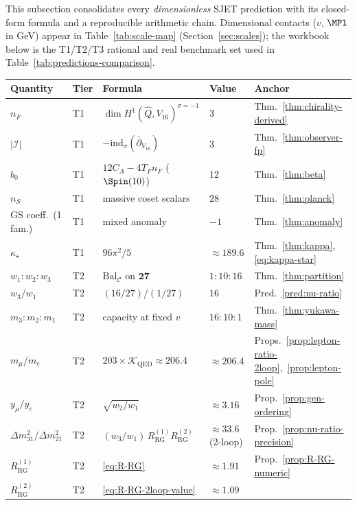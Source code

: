 This subsection consolidates every \emph{dimensionless} SJET prediction with
its closed-form formula and a reproducible arithmetic chain. Dimensional
contacts ($v$, $\MPl$ in GeV) appear in Table~\ref{tab:scale-map}
(Section~\ref{sec:scales}); the workbook below is the T1/T2/T3 rational and
real benchmark set used in Table~\ref{tab:predictions-comparison}.

\begin{table}[ht]
\centering
\small
\renewcommand{\arraystretch}{1.14}
\begin{tabular}{@{}lllll@{}}
\toprule
\textbf{Quantity} & \textbf{Tier} & \textbf{Formula} & \textbf{Value} &
\textbf{Anchor} \\
\midrule
$n_F$ & T1 & $\dim H^1(\hat Q,V_{16})^{\sigma=-1}$ & $3$ &
Thm.~\ref{thm:chirality-derived} \\
$|\mathcal{I}|$ & T1 & $-\mathrm{ind}_\sigma(\bar\partial_{V_{16}})$ & $3$ &
Thm.~\ref{thm:observer-fp} \\
$b_0$ & T1 & $12C_A-4T_Fn_F$ ($\Spin(10)$) & $12$ &
Thm.~\ref{thm:beta} \\
$n_S$ & T1 & massive coset scalars & $28$ &
Thm.~\ref{thm:planck} \\
GS coeff.\ (1 fam.) & T1 & mixed anomaly & $-1$ &
Thm.~\ref{thm:anomaly} \\
$\kappa_\star$ & T1 & $96\pi^2/5$ & $\approx 189.6$ &
Thm.~\ref{thm:kappa}, \eqref{eq:kappa-star} \\
$w_1:w_2:w_3$ & T2 & $\mathrm{Bal}_{\mathcal{C}}$ on $\mathbf{27}$ &
$1:10:16$ &
Thm.~\ref{thm:partition} \\
$w_3/w_1$ & T2 & $(16/27)/(1/27)$ & $16$ &
Pred.~\ref{pred:nu-ratio} \\
$m_3:m_2:m_1$ & T2 & capacity at fixed $v$ & $16:10:1$ &
Thm.~\ref{thm:yukawa-mass} \\
$m_\mu/m_e$ & T2 & $203\times\mathcal{K}_{\mathrm{QED}}\approx206.4$ &
$\approx 206.4$ &
Props.~\ref{prop:lepton-ratio-2loop},~\ref{prop:lepton-pole} \\
$y_\mu/y_e$ & T2 & $\sqrt{w_2/w_1}$ & $\approx 3.16$ &
Prop.~\ref{prop:gen-ordering} \\
$\Delta m^2_{31}/\Delta m^2_{21}$ & T2 &
$(w_3/w_1)\,R_{\mathrm{RG}}^{(1)}R_{\mathrm{RG}}^{(2)}$ &
$\approx 33.6$ (2-loop) &
Prop.~\ref{prop:nu-ratio-precision} \\
$R_{\mathrm{RG}}^{(1)}$ & T2 & \eqref{eq:R-RG} & $\approx 1.91$ &
Prop.~\ref{prop:R-RG-numeric} \\
$R_{\mathrm{RG}}^{(2)}$ & T2 & \eqref{eq:R-RG-2loop-value} & $\approx 1.09$ &

\end{tabular}
\end{table}
